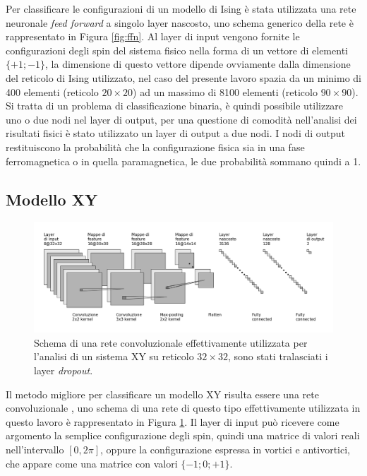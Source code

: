 \documentclass{article}
\begin{document}
Per classificare le configurazioni di un modello di Ising è stata utilizzata una rete neuronale \emph{feed forward} a singolo layer nascosto, uno schema generico della rete è rappresentato in Figura \ref{fig:ffn}.
Al layer di input vengono fornite le configurazioni degli spin del sistema fisico nella forma di un vettore di elementi $\{+1;-1\}$, la dimensione di questo vettore dipende ovviamente dalla dimensione del reticolo di Ising utilizzato, nel caso del presente lavoro spazia da un minimo di 400 elementi (reticolo $20\times20$) ad un massimo di 8100 elementi (reticolo $90\times90$).
Si tratta di un problema di classificazione binaria, è quindi possibile utilizzare uno o due nodi nel layer di output, per una questione di comodità nell'analisi dei risultati fisici è stato utilizzato un layer di output a due nodi.
I nodi di output restituiscono la probabilità che la configurazione fisica sia in una fase ferromagnetica o in quella paramagnetica, le due probabilità sommano quindi a 1.

\subsection{Modello XY}

\begin{figure}
 \centerline{\includegraphics[scale=0.35]{cnn.png}}
 \label{fig:cnn}
 \caption{Schema di una rete convoluzionale effettivamente utilizzata per l'analisi di un sistema XY su reticolo $32\times32$, sono stati tralasciati i layer \emph{dropout}.}
\end{figure}

Il metodo migliore per classificare un modello XY risulta essere una rete convoluzionale \cite{melko}, uno schema di una rete di questo tipo effettivamente utilizzata in questo lavoro è rappresentato in Figura \ref{fig:cnn}.
Il layer di input può ricevere come argomento la semplice configurazione degli spin, quindi una matrice di valori reali nell'intervallo $[0,2\pi]$, oppure la configurazione espressa in vortici e antivortici, che appare come una matrice con valori $\{-1;0;+1\}$.
\end{document}
